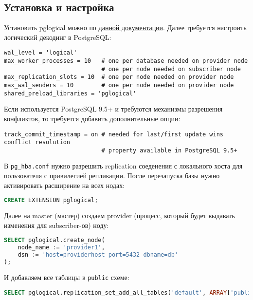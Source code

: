 \subsection{Установка и настройка}


Установить pglogical можно по \href{https://2ndquadrant.com/en/resources/pglogical/pglogical-installation-instructions/}{данной документации}. Далее требуется настроить логический декодинг в PostgreSQL:

\begin{lstlisting}[label=lst:pglogical1,caption=postgresql.conf]
wal_level = 'logical'
max_worker_processes = 10   # one per database needed on provider node
                            # one per node needed on subscriber node
max_replication_slots = 10  # one per node needed on provider node
max_wal_senders = 10        # one per node needed on provider node
shared_preload_libraries = 'pglogical'
\end{lstlisting}

Если используется PostgreSQL 9.5+ и требуются механизмы разрешения конфликтов, то требуется добавить дополнительные опции:

\begin{lstlisting}[label=lst:pglogical2,caption=postgresql.conf]
track_commit_timestamp = on # needed for last/first update wins conflict resolution
                            # property available in PostgreSQL 9.5+
\end{lstlisting}

В \lstinline!pg_hba.conf! нужно разрешить replication соеденения с локального хоста для пользователя с привилегией репликации. После перезапуска базы нужно активировать расширение на всех нодах:

\begin{lstlisting}[label=lst:pglogical3,language=SQL,caption=Активируем расширение]
CREATE EXTENSION pglogical;
\end{lstlisting}

Далее на master (мастер) создаем provider (процесс, который будет выдавать изменения для subscriber-ов) ноду:

\begin{lstlisting}[label=lst:pglogical4,language=SQL,caption=Создаем provider]
SELECT pglogical.create_node(
    node_name := 'provider1',
    dsn := 'host=providerhost port=5432 dbname=db'
);
\end{lstlisting}

И добавляем все таблицы в \lstinline!public! схеме:

\begin{lstlisting}[label=lst:pglogical5,language=SQL,caption=Добавляем в replication set все таблицы в public схеме]
SELECT pglogical.replication_set_add_all_tables('default', ARRAY['public']);
\end{lstlisting}

